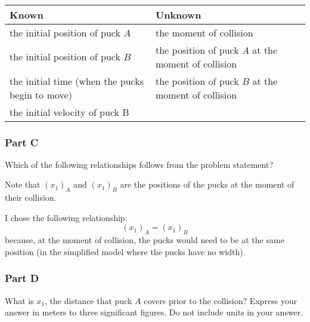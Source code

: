 \begin{solution}~

	\begin{center}
		\begin{tabular}{p{13em}|p{13em}}
			Known                                           & Unknown                                             \\
			\hline
			the initial position of puck $A$                & the moment of collision                             \\
			the initial position of puck $B$                & the position of puck $A$ at the moment of collision \\
			the initial time (when the pucks begin to move) & the position of puck $B$ at the moment of collision \\
			the initial velocity of puck B                  &
		\end{tabular}
	\end{center}

\end{solution}

\subsubsection{Part C}

Which of the following relationships follows from the problem statement?

Note that $\left( x_1 \right)_{A}$  and $\left( x_1 \right)_{B}$ are the positions of the pucks at the moment of their collision.

\vspace{1em}

\begin{solution}
	I chose the following relationship:
	\[
		\left( x_1 \right)_{A} = \left( x_1 \right)_{B}
	\]
	because, at the moment of collision, the pucks would need to be at the same position (in the simplified model where the pucks have no width).
\end{solution}

\subsubsection{Part D}

What is $x_1$, the distance that puck $A$ covers prior to the collision?
Express your answer in meters to three significant figures. Do not include units in your answer.

\vspace{1em}

